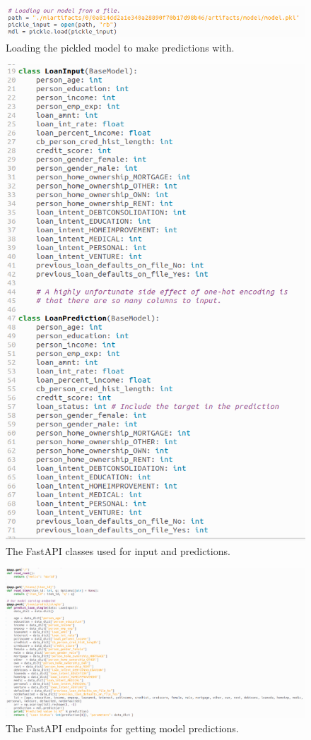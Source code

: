 \documentclass[12pt]{report}
\begin{document}
\begin{figure}[H]
    \centering
    \includegraphics[width=\linewidth]{Implementation/FastAPI+Uvi/LoadModel.png}
    \caption{Loading the pickled model to make predictions with.}
    \label{fig:UviLoadModel}
\end{figure}

\begin{figure}[H]
    \centering
    \includegraphics[width=.5\linewidth]{Implementation/FastAPI+Uvi/InputAndPrediction.png}
    \caption{The FastAPI classes used for input and predictions.}
    \label{fig:UviClasses}
\end{figure}

\begin{figure}[H]
    \centering
    \includegraphics[width=\linewidth]{Implementation/FastAPI+Uvi/Code.png}
    \caption{The FastAPI endpoints for getting model predictions.}
    \label{fig:UviCode}
\end{figure}
\end{document}

